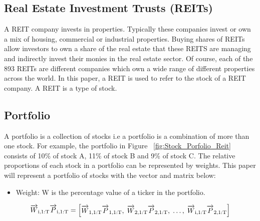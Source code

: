 \documentclass[a4paper,12pt]{report}
\numberwithin{equation}{section}
\theoremstyle{definition}
\begin{document}
\subsection{Real Estate Investment Trusts (REITs)}
A REIT company invests in properties. Typically these companies invest or own a mix of housing, commercial or industrial properties. Buying shares of REITs allow investors to own a share of the real estate that these REITS are managing and indirectly invest their monies in the real estate sector. Of course, each of the 893 REITs are different companies which own a wide range of different properties across the world. In this paper, a REIT is used to refer to the stock of a REIT company. A REIT is a type of stock.

\subsection{Portfolio}
A portfolio is a collection of stocks i.e a portfolio is a combination of more than one stock. For example, the portfolio in Figure ~\ref{fig:Stock_Porfolio_Reit} consists of 10\% of stock A, 11\% of stock B and 9\% of stock C. The relative proportions of each stock in a portfolio can be represented by weights. This paper will represent a portfolio of stocks with the vector and matrix below:
\begin{itemize}

  \item {Weight: W is the percentage value of a ticker in the portfolio.}
  
\end{itemize}

\begin{equation*}
  \overrightarrow{W}\textsubscript{i,1:T}\overrightarrow{P}\textsubscript{i,1:T} = 
  \begin{bmatrix}
    \overrightarrow{W}\textsubscript{1,1:T}\overrightarrow{P}\textsubscript{1,1:T},\;
    \overrightarrow{W}\textsubscript{2,1:T}\overrightarrow{P}\textsubscript{2,1:T},\;
    \ldots,\;
    \overrightarrow{W}\textsubscript{i,1:T}\overrightarrow{P}\textsubscript{2,1:T}
  \end{bmatrix}
\end{equation*}
\end{document}
